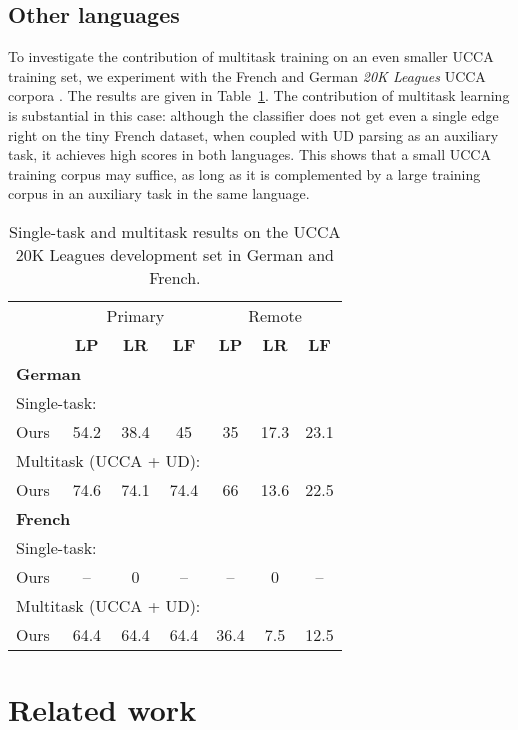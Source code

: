 \documentclass[11pt,a4paper]{article}
\begin{document}
\subsection{Other languages}\label{sec:multilingual}

To investigate the contribution of multitask training on an even smaller UCCA training set,
we experiment with the French and German \textit{20K Leagues} UCCA corpora
\cite{sulem2015conceptual}.
The results are given in Table~\ref{tab:multilingual}.
The contribution of multitask learning is substantial in this case:
although the classifier does not get even a single edge right on the tiny French dataset,
when coupled with UD parsing as an auxiliary task, it achieves high scores
in both languages.
This shows that a small UCCA training corpus may suffice, as long as it is complemented by
a large training corpus in an auxiliary task in the same language.

\begin{table}
\begin{tabular}{l|ccc|ccc}
& \multicolumn{3}{c|}{Primary} & \multicolumn{3}{c}{Remote} \\
& \textbf{LP} & \textbf{LR} & \textbf{LF} & \textbf{LP} & \textbf{LR} & \textbf{LF} \\
\multicolumn{4}{l|}{\textbf{German}} & \\
\multicolumn{4}{l|}{Single-task:} & \\
\small Ours & 54.2 & 38.4 & 45 & 35 & 17.3 & 23.1 \\
\multicolumn{4}{l|}{Multitask (UCCA + UD):} \\
\small Ours & 74.6 & 74.1 & 74.4 & 66 & 13.6 & 22.5 \\
\hline
\multicolumn{4}{l|}{\textbf{French}} & \\
\multicolumn{4}{l|}{Single-task:} & \\
\small Ours & -- & 0 & -- & -- & 0 & -- \\
\multicolumn{4}{l|}{Multitask (UCCA + UD):} & \\
\small Ours & 64.4 & 64.4 & 64.4 & 36.4 & 7.5 & 12.5
\end{tabular}
\caption{Single-task and multitask results on the UCCA 20K Leagues development set in German and French.\label{tab:multilingual}}
\end{table}



\section{Related work}\label{sec:related_work}
\end{document}
